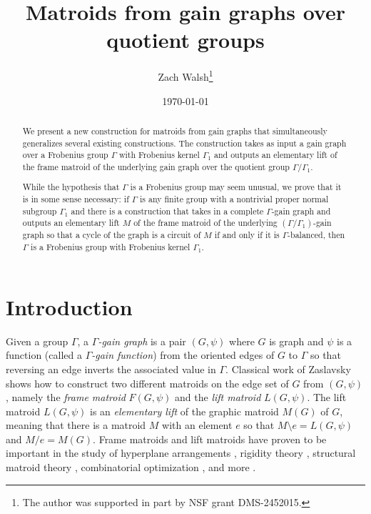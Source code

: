 \documentclass[12pt]{article}
\title{Matroids from gain graphs over quotient groups}
\author{Zach Walsh\thanks{The author was supported in part by NSF grant DMS-2452015.}}
\affil{\small Auburn University, Department of Mathematics and Statistics, Auburn, AL, U.S.A.}
\date{\today}
\theoremstyle{definition}
\newcommand{\del}{\!\setminus\!}
\begin{document}
\maketitle



\begin{abstract}
We present a new construction for matroids from gain graphs that simultaneously generalizes several existing constructions.
The construction takes as input a gain graph over a Frobenius group $\Gamma$ with Frobenius kernel $\Gamma_1$ and outputs an elementary lift of the frame matroid of the underlying gain graph over the quotient group $\Gamma/\Gamma_1$.


While the hypothesis that $\Gamma$ is a Frobenius group may seem unusual, we prove that it is in some sense necessary: if $\Gamma$ is any finite group with a nontrivial proper normal subgroup $\Gamma_1$ and there is a construction that takes in a complete $\Gamma$-gain graph and outputs an elementary lift $M$ of the frame matroid of the underlying $(\Gamma/\Gamma_1)$-gain graph so that a cycle of the graph is a circuit of $M$ if and only if it is $\Gamma$-balanced, then $\Gamma$ is a Frobenius group with Frobenius kernel $\Gamma_1$.
\end{abstract}







\section{Introduction} \label{sec: introduction}

Given a group $\Gamma$, a \emph{$\Gamma$-gain graph} is a pair $(G, \psi)$ where $G$ is graph and $\psi$ is a function (called a \emph{$\Gamma$-gain function}) from the oriented edges of $G$ to $\Gamma$ so that reversing an edge inverts the associated value in $\Gamma$.
Classical work of Zaslavsky \cite{Zaslavsky1991} shows how to construct two different matroids on the edge set of $G$ from $(G, \psi)$, namely the \emph{frame matroid} $F(G, \psi)$ and the \emph{lift matroid} $L(G, \psi)$.
The lift matroid $L(G, \psi)$ is an \emph{elementary lift} of the graphic matroid $M(G)$ of $G$, meaning that there is a matroid $M$ with an element $e$ so that $M\del e = L(G, \psi)$ and $M/e = M(G)$.
Frame matroids and lift matroids have proven to be important in the study of hyperplane arrangements \cite{Anderson-Su-Zaslavsky2024}, rigidity theory \cite{Bernstein2022, Tanigawa-2015}, structural matroid theory \cite{Kahn-Kung1982}, combinatorial optimization \cite{Guenin-Stuive-2016}, and more \cite{Zaslavsky1998_survey}.
\end{document}

